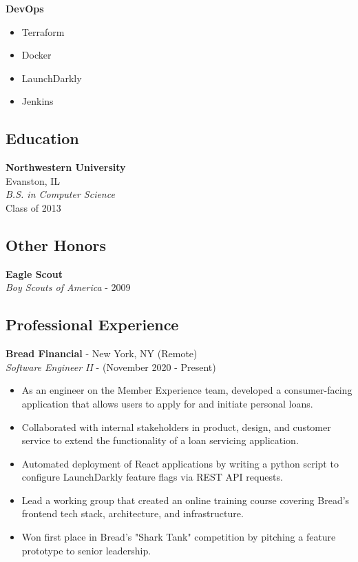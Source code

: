 \documentclass[10pt]{article}
\begin{document}
\begin{paracol}{2}
    \noindent \textbf{DevOps}
    \begin{itemize}
        \item Terraform
        \item Docker
        \item LaunchDarkly
        \item Jenkins
    \end{itemize}

    \subsection*{Education}
    \textbf{Northwestern University} \\
    Evanston, IL \\
    \textit{B.S. in Computer Science}  \\
    {\footnotesize{Class of 2013}}

    \subsection*{Other Honors}
    \textbf{Eagle Scout} \\
    \textit{Boy Scouts of America} - {\footnotesize{2009}}

    \switchcolumn

    \subsection*{Professional Experience}

    \textbf{Bread Financial} - New York, NY (Remote) \\
    \textit{Software Engineer II} - {\footnotesize{(November 2020 - Present)}}
    \begin{itemize}
        \item As an engineer on the Member Experience team, developed a consumer-facing application that allows users to apply for and initiate personal loans.
        \item Collaborated with internal stakeholders in product, design, and customer service to extend the functionality of a loan servicing application.
        \item Automated deployment of React applications by writing a python script to configure LaunchDarkly feature flags via REST API requests.
        \item Lead a working group that created an online training course covering Bread's frontend tech stack, architecture, and infrastructure.
        \item Won first place in Bread's "Shark Tank" competition by pitching a feature prototype to senior leadership.
    \end{itemize}


\end{paracol}
\end{document}
